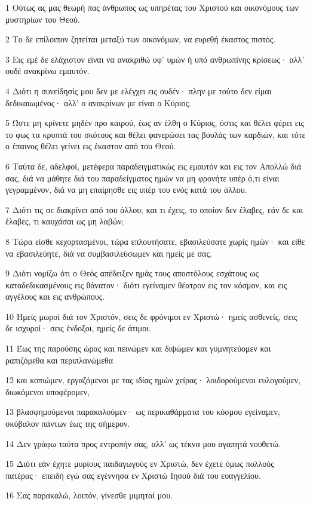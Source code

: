 \par 1 Ούτως ας μας θεωρή πας άνθρωπος ως υπηρέτας του Χριστού και οικονόμους των μυστηρίων του Θεού.
\par 2 Το δε επίλοιπον ζητείται μεταξύ των οικονόμων, να ευρεθή έκαστος πιστός.
\par 3 Εις εμέ δε ελάχιστον είναι να ανακριθώ υφ' υμών ή υπό ανθρωπίνης κρίσεως· αλλ' ουδέ ανακρίνω εμαυτόν.
\par 4 Διότι η συνείδησίς μου δεν με ελέγχει εις ουδέν· πλην με τούτο δεν είμαι δεδικαιωμένος· αλλ' ο ανακρίνων με είναι ο Κύριος.
\par 5 Ώστε μη κρίνετε μηδέν προ καιρού, έως αν έλθη ο Κύριος, όστις και θέλει φέρει εις το φως τα κρυπτά του σκότους και θέλει φανερώσει τας βουλάς των καρδιών, και τότε ο έπαινος θέλει γείνει εις έκαστον από του Θεού.
\par 6 Ταύτα δε, αδελφοί, μετέφερα παραδειγματικώς εις εμαυτόν και εις τον Απολλώ διά σας, διά να μάθητε διά του παραδείγματος ημών να μη φρονήτε υπέρ ό,τι είναι γεγραμμένον, διά να μη επαίρησθε εις υπέρ του ενός κατά του άλλου.
\par 7 Διότι τις σε διακρίνει από του άλλου; και τι έχεις, το οποίον δεν έλαβες, εάν δε και έλαβες, τι καυχάσαι ως μη λαβών;
\par 8 Τώρα είσθε κεχορτασμένοι, τώρα επλουτήσατε, εβασιλεύσατε χωρίς ημών· και είθε να εβασιλεύητε, διά να συμβασιλεύσωμεν και ημείς με σας.
\par 9 Διότι νομίζω ότι ο Θεός απέδειξεν ημάς τους αποστόλους εσχάτους ως καταδεδικασμένους εις θάνατον· διότι εγείναμεν θέατρον εις τον κόσμον, και εις αγγέλους και εις ανθρώπους.
\par 10 Ημείς μωροί διά τον Χριστόν, σεις δε φρόνιμοι εν Χριστώ· ημείς ασθενείς, σεις δε ισχυροί· σεις ένδοξοι, ημείς δε άτιμοι.
\par 11 Έως της παρούσης ώρας και πεινώμεν και διψώμεν και γυμνητεύομεν και ραπιζόμεθα και περιπλανώμεθα
\par 12 και κοπιώμεν, εργαζόμενοι με τας ιδίας ημών χείρας· λοιδορούμενοι ευλογούμεν, διωκόμενοι υποφέρομεν,
\par 13 βλασφημούμενοι παρακαλούμεν· ως περικαθάρματα του κόσμου εγείναμεν, σκύβαλον πάντων έως της σήμερον.
\par 14 Δεν γράφω ταύτα προς εντροπήν σας, αλλ' ως τέκνα μου αγαπητά νουθετώ.
\par 15 Διότι εάν έχητε μυρίους παιδαγωγούς εν Χριστώ, δεν έχετε όμως πολλούς πατέρας· επειδή εγώ σας εγέννησα εν Χριστώ Ιησού διά του ευαγγελίου.
\par 16 Σας παρακαλώ, λοιπόν, γίνεσθε μιμηταί μου.
